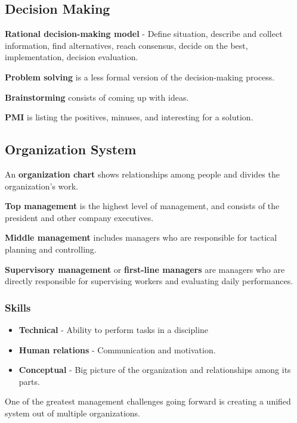 \documentclass[english, 12pt]{article}
\begin{document}
\subsection{Decision Making}
\begin{defn}
\textbf{Rational decision-making model} - Define situation, describe and collect information, find alternatives, reach consensus, decide on the best, implementation, decision evaluation.
\end{defn}
\begin{defn}
\textbf{Problem solving} is a less formal version of the decision-making process.
\end{defn}
\begin{defn}
\textbf{Brainstorming} consists of coming up with ideas.
\end{defn}
\begin{defn}
\textbf{PMI} is listing the positives, minuses, and interesting for a solution.
\end{defn}
\subsection{Organization System}
\begin{defn}
An \textbf{organization chart} shows relationships among people and divides the organization's work.
\end{defn}
\begin{defn}
\textbf{Top management} is the highest level of management, and consists of the president and other company executives.
\end{defn}
\begin{defn}
\textbf{Middle management} includes managers who are responsible for tactical planning and controlling.
\end{defn}
\begin{defn}
\textbf{Supervisory management} or \textbf{first-line managers} are managers who are directly responsible for supervising workers and evaluating daily performances.
\end{defn}
\subsubsection*{Skills}
\begin{itemize}
\item \textbf{Technical} - Ability to perform tasks in a discipline
\item \textbf{Human relations} - Communication and motivation.
\item \textbf{Conceptual} - Big picture of the organization and relationships among its parts.
\end{itemize}
One of the greatest management challenges going forward is creating a unified system out of multiple organizations.
\end{document}
